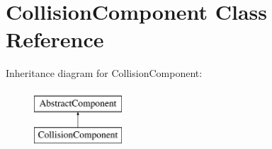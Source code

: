 \hypertarget{classCollisionComponent}{\section{Collision\-Component Class Reference}
\label{classCollisionComponent}
}
Inheritance diagram for Collision\-Component\-:\begin{figure}[H]
\begin{center}
\leavevmode
\includegraphics[height=2.000000cm]{classCollisionComponent}
\end{center}
\end{figure}
